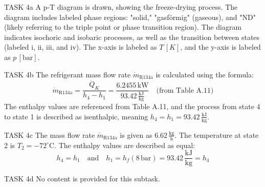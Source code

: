 TASK 4a  
A p-T diagram is drawn, showing the freeze-drying process. The diagram includes labeled phase regions: "solid," "gasförmig" (gaseous), and "ND" (likely referring to the triple point or phase transition region). The diagram indicates isochoric and isobaric processes, as well as the transition between states (labeled i, ii, iii, and iv). The x-axis is labeled as \( T \, [K] \), and the y-axis is labeled as \( p \, [\text{bar}] \).  

TASK 4b  
The refrigerant mass flow rate \( \dot{m}_{\text{R134a}} \) is calculated using the formula:  
\[
\dot{m}_{\text{R134a}} = \frac{\dot{Q}_K}{h_{4} - h_{1}} = \frac{6.2455 \, \text{kW}}{93.42 \, \frac{\text{kJ}}{\text{kg}}} \quad \text{(from Table A.11)}
\]  
The enthalpy values are referenced from Table A.11, and the process from state 4 to state 1 is described as isenthalpic, meaning \( h_4 = h_1 = 93.42 \, \frac{\text{kJ}}{\text{kg}} \).  

TASK 4c  
The mass flow rate \( \dot{m}_{\text{R134a}} \) is given as \( 6.62 \, \frac{\text{kg}}{\text{h}} \).  
The temperature at state 2 is \( T_2 = -72^\circ\text{C} \).  
The enthalpy values are described as equal:  
\[
h_4 = h_1 \quad \text{and} \quad h_1 = h_f(8 \, \text{bar}) = 93.42 \, \frac{\text{kJ}}{\text{kg}} = h_4
\]  

TASK 4d  
No content is provided for this subtask.  

